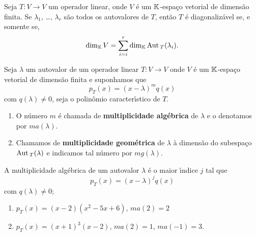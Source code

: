 \begin{corolario}
    Seja $T : V \to V$ um operador linear, onde $V$ \'e um $\mathbb{K}$-espa\c{c}o vetorial de dimens\~ao finita. Se $\lambda_1$, \dots, $\lambda_r$ s\~ao todos os autovalores de $T$, ent\~ao $T$ \'e diagonaliz\'avel se, e somente se,
    \[
        \dim_{\mathbb{K}} V = \sum_{i = i}^r\dim_{\mathbb{K}}{\rm Aut\,}_T(\lambda_i).
    \]
\end{corolario}

\begin{definicao}
    Seja $\lambda$ um autovalor de um operador linear $T : V \to V$ onde $V$ \'e um $\mathbb{K}$-espa\c{c}o vetorial de dimens\~ao finita e suponhamos que
    \[
        p_T(x) = (x - \lambda)^mq(x)
    \]
    com $q(\lambda) \ne 0$, seja o polin\^omio caracter{\'\i}stico de $T$.
    \begin{enumerate}[label={\roman*})]
        \item O n\'umero $m$ \'e chamada de \textbf{multiplicidade alg\'ebrica} de $\lambda$ e o denotamos por $ma(\lambda)$.
        \item Chamamos de \textbf{multiplicidade geom\'etrica} de $\lambda$ \`a dimens\~ao do subespa\c{c}o ${\rm Aut\,}_T(\lambda)$ e indicamos tal n\'umero por $mg(\lambda)$.
    \end{enumerate}
\end{definicao}

\begin{observacao}
    A multiplicidade alg\'ebrica de um autovalor $\lambda$ \'e o maior {\'\i}ndice $j$ tal que
    \[
        p_T(x) = (x - \lambda)^jq(x)
    \]
    com $q(\lambda) \ne 0$;
\end{observacao}

\begin{exemplo}
    \begin{enumerate}[label={\arabic*})]
        \item $p_T(x) = (x - 2)(x^2 - 5x + 6)$, $ma(2) = 2$
        \item $p_T(x) = (x + 1)^3(x - 2)$, $ma(2) = 1$, $ma(-1) = 3$.
    \end{enumerate}
\end{exemplo}

